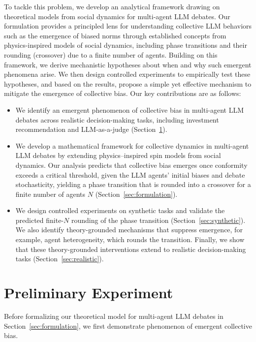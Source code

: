 \documentclass{article}
\theoremstyle{plain}
\theoremstyle{definition}
\theoremstyle{remark}
\begin{document}
To tackle this problem, we develop an analytical framework drawing on theoretical models from social dynamics for multi-agent LLM debates. 
Our formulation provides a principled lens for understanding collective LLM behaviors such as the emergence of biased norms through established concepts from physics-inspired models of social dynamics, including phase transitions and their rounding (crossover) due to a finite number of agents. 
Building on this framework, we derive mechanistic hypotheses about when and why such emergent phenomena arise. 
We then design controlled experiments to empirically test these hypotheses, and based on the results, propose a simple yet effective mechanism to mitigate the emergence of collective bias. 
Our key contributions are as follows: 
\begin{itemize}[leftmargin=*, itemsep=0pt]
    \item We identify an emergent phenomenon of collective bias in multi-agent LLM debates across realistic decision-making tasks, including investment recommendation and LLM-as-a-judge (Section~\ref{sec:preliminary}).
    \item We develop a mathematical framework for collective dynamics in multi-agent LLM debates by extending physics–inspired spin models from social dynamics. Our analysis predicts that collective bias emerges once conformity exceeds a critical threshold, given the LLM agents' initial biases and debate stochasticity, yielding a phase transition that is rounded into a crossover for a finite number of agents $N$ (Section~\ref{sec:formulation}). 
    \item We design controlled experiments on synthetic tasks and validate the predicted finite-$N$ rounding of the phase transition (Section~\ref{sec:synthetic}). We also identify theory-grounded mechanisms that suppress emergence, for example, agent heterogeneity, which rounds the transition. Finally, we show that these theory-grounded interventions extend to realistic decision-making tasks (Section~\ref{sec:realistic}). 
\end{itemize}









\section{Preliminary Experiment}\label{sec:preliminary}
Before formalizing our theoretical model for multi-agent LLM debates in Section~\ref{sec:formulation}, we first demonstrate phenomenon of emergent collective bias. 
\end{document}
